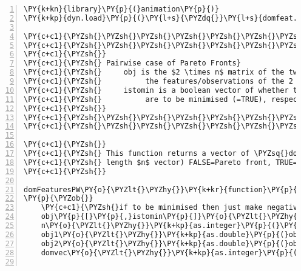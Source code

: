 \begin{Verbatim}[commandchars=\\\{\},codes={\catcode`\$=3\catcode`\^=7\catcode`\_=8},gobble=0,numbers=left,fontfamily=fvm,fontshape=n,fontsize=\footnotesize,tabsize=2]
\PY{k+kn}{library}\PY{p}{(}animation\PY{p}{)}
\PY{k+kp}{dyn.load}\PY{p}{(}\PY{l+s}{\PYZdq{}}\PY{l+s}{domfeat.so\PYZdq{}}\PY{p}{)}

\PY{c+c1}{\PYZsh{}\PYZsh{}\PYZsh{}\PYZsh{}\PYZsh{}\PYZsh{}\PYZsh{}\PYZsh{}\PYZsh{}\PYZsh{}\PYZsh{}\PYZsh{}\PYZsh{}\PYZsh{}\PYZsh{}\PYZsh{}\PYZsh{}\PYZsh{}\PYZsh{}\PYZsh{}\PYZsh{}\PYZsh{}\PYZsh{}\PYZsh{}\PYZsh{}\PYZsh{}\PYZsh{}\PYZsh{}\PYZsh{}\PYZsh{}\PYZsh{}\PYZsh{}\PYZsh{}\PYZsh{}\PYZsh{}\PYZsh{}\PYZsh{}\PYZsh{}\PYZsh{}\PYZsh{}\PYZsh{}\PYZsh{}}
\PY{c+c1}{\PYZsh{}\PYZsh{}\PYZsh{}\PYZsh{}\PYZsh{}\PYZsh{}\PYZsh{}\PYZsh{}\PYZsh{}\PYZsh{}\PYZsh{}\PYZsh{}\PYZsh{}\PYZsh{}\PYZsh{}\PYZsh{}\PYZsh{}\PYZsh{}\PYZsh{}\PYZsh{}\PYZsh{}\PYZsh{}\PYZsh{}\PYZsh{}\PYZsh{}\PYZsh{}\PYZsh{}\PYZsh{}\PYZsh{}\PYZsh{}\PYZsh{}\PYZsh{}\PYZsh{}\PYZsh{}\PYZsh{}\PYZsh{}\PYZsh{}\PYZsh{}\PYZsh{}\PYZsh{}\PYZsh{}\PYZsh{}}
\PY{c+c1}{\PYZsh{}}
\PY{c+c1}{\PYZsh{} Pairwise case of Pareto Fronts}
\PY{c+c1}{\PYZsh{}     obj is the $2 \times n$ matrix of the two vectors of length $n$ for  }
\PY{c+c1}{\PYZsh{}			the features/observations of the 2 criteria/objective functions}
\PY{c+c1}{\PYZsh{}     istomin is a boolean vector of whether the criteria obj$_1$, obj$_2$  }
\PY{c+c1}{\PYZsh{}			are to be minimised (=TRUE), respectively}
\PY{c+c1}{\PYZsh{}}
\PY{c+c1}{\PYZsh{}\PYZsh{}\PYZsh{}\PYZsh{}\PYZsh{}\PYZsh{}\PYZsh{}\PYZsh{}\PYZsh{}\PYZsh{}\PYZsh{}\PYZsh{}\PYZsh{}\PYZsh{}\PYZsh{}\PYZsh{}\PYZsh{}\PYZsh{}\PYZsh{}\PYZsh{}\PYZsh{}\PYZsh{}\PYZsh{}\PYZsh{}\PYZsh{}\PYZsh{}\PYZsh{}\PYZsh{}\PYZsh{}\PYZsh{}\PYZsh{}\PYZsh{}\PYZsh{}\PYZsh{}\PYZsh{}\PYZsh{}\PYZsh{}\PYZsh{}\PYZsh{}\PYZsh{}\PYZsh{}\PYZsh{}}
\PY{c+c1}{\PYZsh{}\PYZsh{}\PYZsh{}\PYZsh{}\PYZsh{}\PYZsh{}\PYZsh{}\PYZsh{}\PYZsh{}\PYZsh{}\PYZsh{}\PYZsh{}\PYZsh{}\PYZsh{}\PYZsh{}\PYZsh{}\PYZsh{}\PYZsh{}\PYZsh{}\PYZsh{}\PYZsh{}\PYZsh{}\PYZsh{}\PYZsh{}\PYZsh{}\PYZsh{}\PYZsh{}\PYZsh{}\PYZsh{}\PYZsh{}\PYZsh{}\PYZsh{}\PYZsh{}\PYZsh{}\PYZsh{}\PYZsh{}\PYZsh{}\PYZsh{}\PYZsh{}\PYZsh{}\PYZsh{}\PYZsh{}}

\PY{c+c1}{\PYZsh{}}
\PY{c+c1}{\PYZsh{} This function returns a vector of \PYZsq{}dominated\PYZsq{} observations (Boolean, }
\PY{c+c1}{\PYZsh{} length $n$ vector) FALSE=Pareto front, TRUE=dominated observation}
\PY{c+c1}{\PYZsh{}}

domFeaturesPW\PY{o}{\PYZlt{}\PYZhy{}}\PY{k+kr}{function}\PY{p}{(}obj\PY{p}{,}istomin\PY{p}{)}
\PY{p}{\PYZob{}}
	\PY{c+c1}{\PYZsh{}if to be minimised then just make negative and maximise}
	obj\PY{p}{[}\PY{p}{,}istomin\PY{p}{]}\PY{o}{\PYZlt{}\PYZhy{}} \PY{o}{\PYZhy{}}obj\PY{p}{[}\PY{p}{,}istomin\PY{p}{]} 
	n\PY{o}{\PYZlt{}\PYZhy{}}\PY{k+kp}{as.integer}\PY{p}{(}\PY{k+kp}{nrow}\PY{p}{(}obj\PY{p}{)}\PY{p}{)}
	obj1\PY{o}{\PYZlt{}\PYZhy{}}\PY{k+kp}{as.double}\PY{p}{(}obj\PY{p}{[}\PY{p}{,}\PY{l+m}{1}\PY{p}{]}\PY{p}{)}
	obj2\PY{o}{\PYZlt{}\PYZhy{}}\PY{k+kp}{as.double}\PY{p}{(}obj\PY{p}{[}\PY{p}{,}\PY{l+m}{2}\PY{p}{]}\PY{p}{)}
	domvec\PY{o}{\PYZlt{}\PYZhy{}}\PY{k+kp}{as.integer}\PY{p}{(}\PY{k+kp}{rep}\PY{p}{(}\PY{l+m}{0}\PY{p}{,}n\PY{p}{)}\PY{p}{)} \PY{c+c1}{\PYZsh{}output vector}
	

\end{Verbatim}
